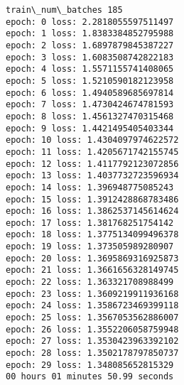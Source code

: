 \documentclass[11pt]{article}
\begin{document}
    \begin{Verbatim}[commandchars=\\\{\}]
train\_num\_batches 185
epoch: 0 loss: 2.2818055597511497
epoch: 1 loss: 1.8383384852795988
epoch: 2 loss: 1.6897879845387227
epoch: 3 loss: 1.6083508742822183
epoch: 4 loss: 1.5571155741408065
epoch: 5 loss: 1.5210590182123958
epoch: 6 loss: 1.4940589685697814
epoch: 7 loss: 1.4730424674781593
epoch: 8 loss: 1.4561327470315468
epoch: 9 loss: 1.4421495405403344
epoch: 10 loss: 1.4304097974622572
epoch: 11 loss: 1.4205671742155745
epoch: 12 loss: 1.4117792123072856
epoch: 13 loss: 1.4037732723596934
epoch: 14 loss: 1.396948775085243
epoch: 15 loss: 1.3912428868783486
epoch: 16 loss: 1.3862537145614624
epoch: 17 loss: 1.381768251754142
epoch: 18 loss: 1.3775134099496378
epoch: 19 loss: 1.373505989280907
epoch: 20 loss: 1.3695869316925873
epoch: 21 loss: 1.3661656328149745
epoch: 22 loss: 1.363321708988499
epoch: 23 loss: 1.3609219911936168
epoch: 24 loss: 1.3586723469399118
epoch: 25 loss: 1.3567053562886007
epoch: 26 loss: 1.3552206058759948
epoch: 27 loss: 1.3530423963392102
epoch: 28 loss: 1.3502178797850737
epoch: 29 loss: 1.348085652815329
00 hours 01 minutes 50.99 seconds

    \end{Verbatim}
\end{document}
